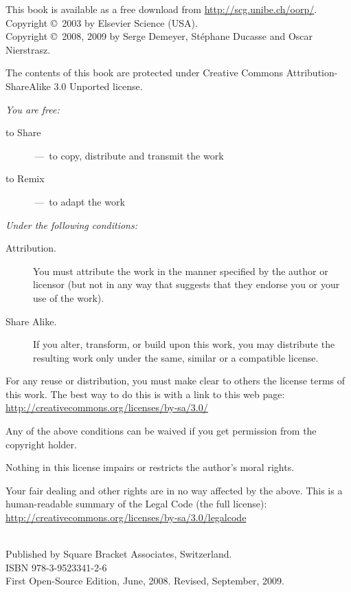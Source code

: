 \documentclass[a4paper,10pt,twoside]{book}
\begin{document}
\begin{footnotesize}
\setlength{\parindent}{0pt}
This book is available as a free download from \url{http://scg.unibe.ch/oorp/}.\\[1cm]

Copyright \copyright~2003 by Elsevier Science (USA).\\
Copyright \copyright~2008, 2009 by Serge Demeyer, St\'ephane Ducasse and Oscar Nierstrasz.

The contents of this book are protected under Creative Commons Attribution-ShareAlike 3.0 Unported license.

\emph{You are free:}
\begin{description}
  \item[to Share] \,---\, to copy, distribute and transmit the work
  \item[to Remix] \,---\, to adapt the work
\end{description}
\emph{Under the following conditions:}
\begin{description}
  \item[Attribution.] You must attribute the work in the manner specified by the author or licensor (but not in any way that suggests that they endorse you or your use of the work).
  \item[Share Alike.] If you alter, transform, or build upon this work, you may distribute the resulting work only under the same, similar or a compatible license.
\end{description}
\begin{bulletlist}
  \item For any reuse or distribution, you must make clear to others the license terms of this work. The best way to do this is with a link to this web page:
  \url{http://creativecommons.org/licenses/by-sa/3.0/}
  \item Any of the above conditions can be waived if you get permission from the copyright holder.
  \item Nothing in this license impairs or restricts the author's moral rights.
\end{bulletlist}
\quad
\parbox{\textwidth-2cm-1em}{
	Your fair dealing and other rights are in no way affected by the above.
	This is a human-readable summary of the Legal Code (the full license):\\
	\url{http://creativecommons.org/licenses/by-sa/3.0/legalcode}}\\[1cm]
Published by Square Bracket Associates, Switzerland. \sba\\
ISBN 978-3-9523341-2-6\\
First Open-Source Edition, June, 2008. Revised, September, 2009.
\end{footnotesize}
\end{document}
